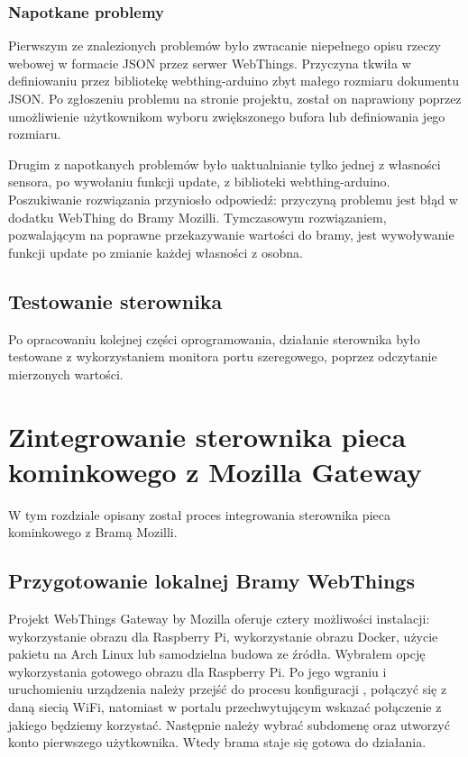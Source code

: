 \documentclass[11pt]{report}
\begin{document}
 \subsection{Napotkane problemy}
 Pierwszym ze znalezionych problemów było zwracanie niepełnego opisu rzeczy webowej w formacie JSON przez serwer WebThings. Przyczyna tkwiła w definiowaniu przez bibliotekę webthing-arduino zbyt małego rozmiaru dokumentu JSON. Po zgłoszeniu problemu na stronie projektu, został on naprawiony poprzez umożliwienie użytkownikom wyboru zwiększonego bufora lub definiowania jego rozmiaru.
 
 Drugim z napotkanych problemów było uaktualnianie tylko jednej z własności sensora, po wywołaniu funkcji update, z biblioteki webthing-arduino. Poszukiwanie rozwiązania przyniosło odpowiedź: przyczyną problemu jest błąd w dodatku WebThing do Bramy Mozilli. Tymczasowym rozwiązaniem, pozwalającym na poprawne przekazywanie wartości do bramy, jest wywoływanie funkcji update po zmianie każdej własności z osobna.

 \section{Testowanie sterownika}
 Po opracowaniu kolejnej części oprogramowania, działanie sterownika było testowane z wykorzystaniem monitora portu szeregowego, poprzez odczytanie mierzonych wartości.


 \chapter{Zintegrowanie sterownika pieca kominkowego z Mozilla Gateway}\label{ch:gateway}
 W tym rozdziale opisany został proces integrowania sterownika pieca kominkowego z Bramą Mozilli.
 
 \section{Przygotowanie lokalnej Bramy WebThings}
  Projekt WebThings Gateway by Mozilla oferuje cztery możliwości instalacji: wykorzystanie obrazu dla Raspberry Pi, wykorzystanie obrazu Docker, użycie pakietu na Arch Linux lub samodzielna budowa ze źródła. Wybrałem opcję wykorzystania gotowego obrazu dla Raspberry Pi.
  Po jego wgraniu i uruchomieniu urządzenia należy przejść do procesu konfiguracji \cite{gatewaystarted2019}, połączyć się z daną siecią WiFi, natomiast w portalu przechwytującym wskazać połączenie z jakiego będziemy korzystać. Następnie należy wybrać subdomenę oraz utworzyć konto pierwszego użytkownika. Wtedy brama staje się gotowa do działania.
\end{document}
